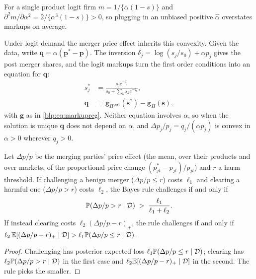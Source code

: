 For a single product logit firm $m = 1/\{\alpha(1-s)\}$ and $\partial^2 m/\partial\alpha^2 =
2/\{\alpha^3(1-s)\}>0$, so plugging in an unbiased positive $\hat\alpha$ overstates markups on average.

Under logit demand the merger price effect inherits this convexity. Given the data, write $\bm q=\alpha(\bm p^\ast-\bm p)$. The inversion $\delta_j=\log(s_j/s_0)+\alpha p_j$ gives the post merger shares, and the logit markups turn the first order conditions into an equation for $\bm q$:
\[
\begin{aligned}
s_j^\ast&=\frac{s_je^{-q_j}}{s_0+\sum_k s_ke^{-q_k}},\\
\bm q&=\bm g_{H^{\mathrm{post}}}(\bm s^\ast)-\bm g_H(\bm s),
\end{aligned}
\]
with $\bm g$ as in \eqref{blp:eq:markupreg}. Neither equation involves $\alpha$, so when the solution is unique $\bm q$ does not depend on $\alpha$, and $\Delta p_j/p_j=q_j/(\alpha p_j)$ is convex in $\alpha>0$ wherever $q_j>0$.

\begin{proposition}\label{blp:prop:decision}
Let $\Delta p/p$ be the merging parties' price effect (the mean, over their products and over markets, of the proportional price change $(p^\ast_{jt}-p_{jt})/p_{jt}$) and $r$ a harm threshold.
If challenging a benign merger ($\Delta p/p\le r$) costs $\ell_1$ and clearing a harmful one
($\Delta p/p>r$) costs $\ell_2$, the Bayes rule challenges if and only if
\[
\mathbb{P}(\Delta p/p > r \mid \mathcal{D}) \;>\; \frac{\ell_1}{\ell_1+\ell_2}.
\]
If instead clearing costs $\ell_2(\Delta p/p-r)_+$, the rule challenges if and only if
$\ell_2\,\mathbb{E}[(\Delta p/p-r)_+\mid\mathcal{D}] > \ell_1\mathbb{P}(\Delta p/p\le r\mid\mathcal{D})$.
\end{proposition}
\begin{proof}
Challenging has posterior expected loss $\ell_1\mathbb{P}(\Delta p/p\le r\mid\mathcal{D})$; clearing has
$\ell_2\mathbb{P}(\Delta p/p>r\mid\mathcal{D})$ in the first case and $\ell_2\mathbb{E}[(\Delta p/p-r)_+\mid\mathcal{D}]$ in the
second. The rule picks the smaller.
\end{proof}


